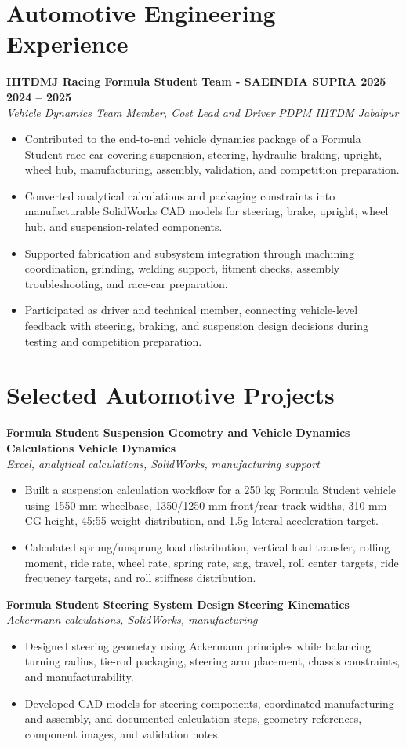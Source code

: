 \documentclass[9pt,a4paper]{extarticle}
\newcommand{\resumeSubheading}[4]{\vspace{1pt}\textbf{#1} \hfill \textbf{#2}\\[-2pt]\textit{#3} \hfill \textit{#4}\vspace{-2pt}}
\newcommand{\resumeProject}[3]{\vspace{1pt}\textbf{#1} \hfill \textbf{#2}\\[-2pt]\textit{#3}\vspace{-3pt}}
\begin{document}
\section*{Automotive Engineering Experience}
\resumeSubheading{IIITDMJ Racing Formula Student Team - SAEINDIA SUPRA 2025}{2024 -- 2025}{Vehicle Dynamics Team Member, Cost Lead and Driver}{PDPM IIITDM Jabalpur}
\begin{itemize}
    \item Contributed to the end-to-end vehicle dynamics package of a Formula Student race car covering suspension, steering, hydraulic braking, upright, wheel hub, manufacturing, assembly, validation, and competition preparation.
    \item Converted analytical calculations and packaging constraints into manufacturable SolidWorks CAD models for steering, brake, upright, wheel hub, and suspension-related components.
    \item Supported fabrication and subsystem integration through machining coordination, grinding, welding support, fitment checks, assembly troubleshooting, and race-car preparation.
    \item Participated as driver and technical member, connecting vehicle-level feedback with steering, braking, and suspension design decisions during testing and competition preparation.
\end{itemize}

\section*{Selected Automotive Projects}
\resumeProject{Formula Student Suspension Geometry and Vehicle Dynamics Calculations}{Vehicle Dynamics}{Excel, analytical calculations, SolidWorks, manufacturing support}
\begin{itemize}
    \item Built a suspension calculation workflow for a 250 kg Formula Student vehicle using 1550 mm wheelbase, 1350/1250 mm front/rear track widths, 310 mm CG height, 45:55 weight distribution, and 1.5g lateral acceleration target.
    \item Calculated sprung/unsprung load distribution, vertical load transfer, rolling moment, ride rate, wheel rate, spring rate, sag, travel, roll center targets, ride frequency targets, and roll stiffness distribution.
\end{itemize}

\resumeProject{Formula Student Steering System Design}{Steering Kinematics}{Ackermann calculations, SolidWorks, manufacturing}
\begin{itemize}
    \item Designed steering geometry using Ackermann principles while balancing turning radius, tie-rod packaging, steering arm placement, chassis constraints, and manufacturability.
    \item Developed CAD models for steering components, coordinated manufacturing and assembly, and documented calculation steps, geometry references, component images, and validation notes.
\end{itemize}
\end{document}
